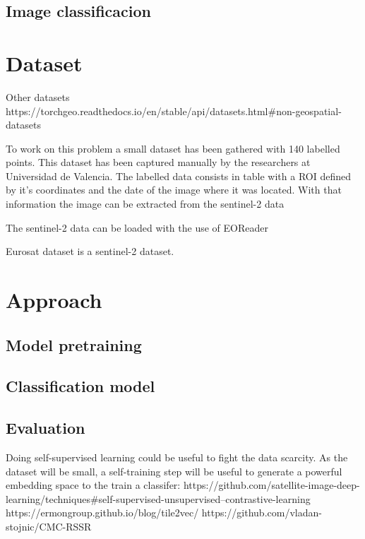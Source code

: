 \documentclass[conference]{IEEEtran}
\begin{document}
    \subsection{Image classificacion}


    \section{Dataset}
    Other datasets
    https://torchgeo.readthedocs.io/en/stable/api/datasets.html#non-geospatial-datasets

    To work on this problem a small dataset has been gathered with 140 labelled points.
    This dataset has been captured manually by the researchers at Universidad de Valencia.
    The labelled data consists in table with a ROI defined by it's coordinates and the date
    of the image where it was located.
    With that information the image can be extracted from the sentinel-2 data

    The sentinel-2 data can be loaded with the use of EOReader\citep{eoreader_paper}

    Eurosat dataset\citep{helber2019eurosat} is a sentinel-2 dataset.


    \section{Approach}

    \subsection{Model pretraining}

    \subsection{Classification model}

    \subsection{Evaluation}



    Doing self-supervised learning could be useful to fight the data scarcity.
    As the dataset will be small, a self-training step will be useful to generate
    a powerful embedding space to the train a classifer:
    https://github.com/satellite-image-deep-learning/techniques#self-supervised-unsupervised--contrastive-learning
    https://ermongroup.github.io/blog/tile2vec/
    https://github.com/vladan-stojnic/CMC-RSSR
\end{document}

